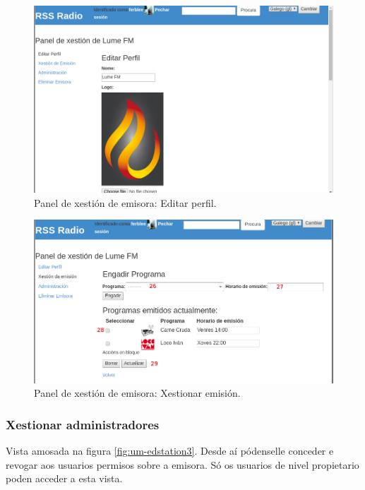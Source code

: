 \begin{figure}[H]
	\centering
	\includegraphics[scale=0.43,keepaspectratio=true]{./images/usermanual/um-edstation1.png}
	\caption{Panel de xestión de emisora: Editar perfil.}
	\label{fig:um-edstation1}
\end{figure}

\begin{figure}[H]
	\centering
	\includegraphics[scale=0.43,keepaspectratio=true]{./images/usermanual/um-edstation2.png}
	\caption{Panel de xestión de emisora: Xestionar emisión.}
	\label{fig:um-edstation2}
\end{figure}

\subsubsection{Xestionar administradores}
\label{xadmin}
Vista amosada na figura \ref{fig:um-edstation3}. Desde aí pódenselle conceder e revogar aos usuarios permisos sobre a emisora. Só os usuarios de nivel propietario poden acceder a esta vista. 

